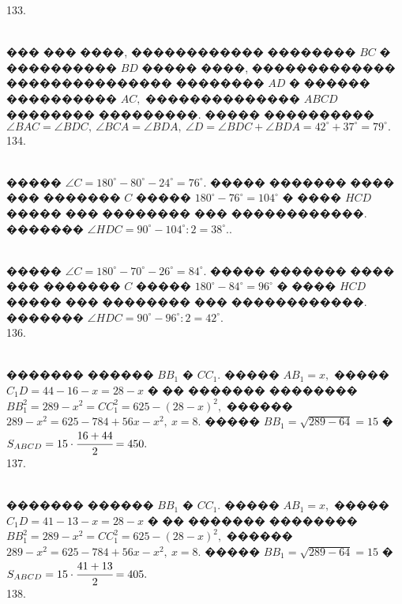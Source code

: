 \documentclass[12pt]{article}
\begin{document}
133. \begin{figure}[ht!]
\end{figure}\\
��� ��� ����, ������������ �������� $BC$ � ���������� $BD$ ����� ����, ������������� ��������������� �������� $AD$ � ������ ���������� $AC,$ �������������� $ABCD$ �������� ���������. ����� ���������� $\angle BAC=\angle BDC,\ \angle BCA=\angle BDA,\ \angle D=\angle BDC+\angle BDA=42^\circ+37^\circ=79^\circ.$\\
134. \begin{figure}[ht!]
\end{figure}\\
����� $\angle C=180^\circ-80^\circ-24^\circ=76^\circ.$ ����� ������� ���� ��� ������� $C$ ����� $180^\circ-76^\circ=104^\circ$ � ���� $HCD$ ����� ��� �������� ��� ������������. ������� $\angle HDC=90^\circ-104^\circ:2=38^\circ.$\newpage{}. \begin{figure}[ht!]
\end{figure}\\
����� $\angle C=180^\circ-70^\circ-26^\circ=84^\circ.$ ����� ������� ���� ��� ������� $C$ ����� $180^\circ-84^\circ=96^\circ$ � ���� $HCD$ ����� ��� �������� ��� ������������. ������� $\angle HDC=90^\circ-96^\circ:2=42^\circ.$\\
136. \begin{figure}[ht!]
\end{figure}\\
������� ������ $BB_1$ � $CC_1.$ ����� $AB_1=x,$ ����� $C_1D=44-16-x=28-x$ � �� ������� �������� $BB_1^2=289-x^2=CC_1^2=625-(28-x)^2,$ ������
$289-x^2=625-784+56x-x^2,\ x=8.$ ����� $BB_1=\sqrt{289-64}=15$ � $S_{ABCD}=15\cdot\cfrac{16+44}{2}=450.$\\
137. \begin{figure}[ht!]
\end{figure}\\
������� ������ $BB_1$ � $CC_1.$ ����� $AB_1=x,$ ����� $C_1D=41-13-x=28-x$ � �� ������� �������� $BB_1^2=289-x^2=CC_1^2=625-(28-x)^2,$ ������
$289-x^2=625-784+56x-x^2,\ x=8.$ ����� $BB_1=\sqrt{289-64}=15$ � $S_{ABCD}=15\cdot\cfrac{41+13}{2}=405.$\\
138. \begin{figure}[ht!]
\end{figure}\\
\end{document}
